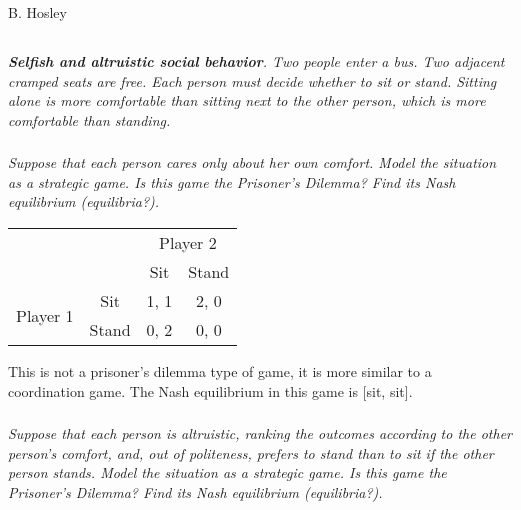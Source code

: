 \documentclass[12pt]{amsart}
\begin{document}
\raggedbottom

\hspace{\fill} {\large B. Hosley}
\bigskip


\subsection{}
\textit{\textbf{Selfish and altruistic social behavior}. Two people enter a bus. Two adjacent cramped seats
	are free. Each person must decide whether to sit or stand. Sitting alone is more comfortable
	than sitting next to the other person, which is more comfortable than standing.}
	
	\subsubsection{}
	\textit{Suppose that each person cares only about her own comfort. Model the situation as a
	strategic game. Is this game the Prisoner’s Dilemma? Find its Nash equilibrium
	(equilibria?).}
	
	\begin{center}
		\def\arraystretch{1.25}%
		\begin{tabular}{cccc}
			&                            & \multicolumn{2}{c}{Player 2}                           \\
			& \multicolumn{1}{c|}{}      & \multicolumn{1}{c|}{Sit}  & \multicolumn{1}{c|}{Stand} \\ \cline{2-4} 
			\multirow{2}{*}{Player 1} & \multicolumn{1}{c|}{Sit}   & \multicolumn{1}{c|}{1, 1} & \multicolumn{1}{c|}{2, 0}  \\ \cline{2-4} 
			& \multicolumn{1}{c|}{Stand} & \multicolumn{1}{c|}{0, 2} & \multicolumn{1}{c|}{0, 0}  \\ \cline{2-4} 
		\end{tabular}
	\end{center}
	
	This is not a prisoner's dilemma type of game, 
	it is more similar to a coordination game.
	The Nash equilibrium in this game is [sit, sit].
	
	\subsubsection{}
	\textit{Suppose that each person is altruistic, ranking the outcomes according to the other
	person’s comfort, and, out of politeness, prefers to stand than to sit if the other person
	stands. Model the situation as a strategic game. Is this game the Prisoner’s Dilemma?
	Find its Nash equilibrium (equilibria?).}
	
\end{document}
